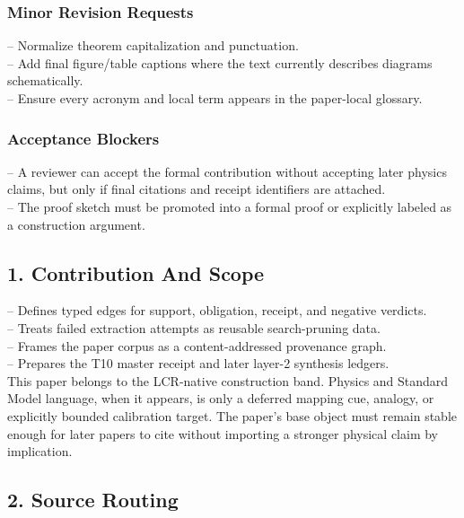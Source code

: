 \documentclass[11pt]{article}
\begin{document}
\subsubsection*{Minor Revision Requests}

\noindent{}-- Normalize theorem capitalization and punctuation.\\
\noindent{}-- Add final figure/table captions where the text currently describes diagrams schematically.\\
\noindent{}-- Ensure every acronym and local term appears in the paper-local glossary.\\

\subsubsection*{Acceptance Blockers}

\noindent{}-- A reviewer can accept the formal contribution without accepting later physics claims, but only if final citations and receipt identifiers are attached.\\
\noindent{}-- The proof sketch must be promoted into a formal proof or explicitly labeled as a construction argument.\\


\subsection*{1. Contribution And Scope}

\noindent{}-- Defines typed edges for support, obligation, receipt, and negative verdicts.\\
\noindent{}-- Treats failed extraction attempts as reusable search-pruning data.\\
\noindent{}-- Frames the paper corpus as a content-addressed provenance graph.\\
\noindent{}-- Prepares the T10 master receipt and later layer-2 synthesis ledgers.\\

This paper belongs to the LCR-native construction band. Physics and Standard Model language, when it appears, is only a deferred mapping cue, analogy, or explicitly bounded calibration target. The paper's base object must remain stable enough for later papers to cite without importing a stronger physical claim by implication.

\subsection*{2. Source Routing}
\end{document}
